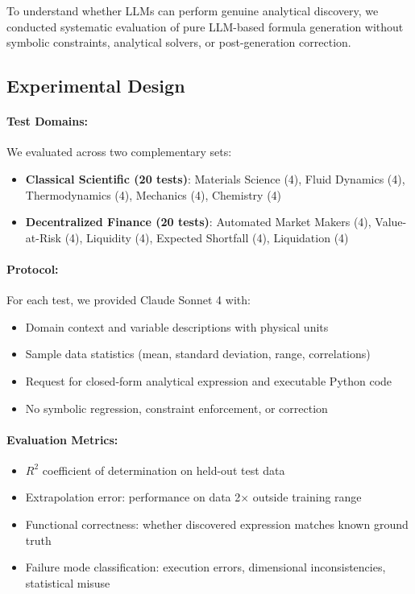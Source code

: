 \documentclass[twoside,11pt]{article}
\begin{document}
To understand whether LLMs can perform genuine analytical discovery, we conducted systematic evaluation of pure LLM-based formula generation without symbolic constraints, analytical solvers, or post-generation correction.

\subsection{Experimental Design}

\paragraph{Test Domains:} We evaluated across two complementary sets:

\begin{itemize}
\item \textbf{Classical Scientific (20 tests)}: Materials Science (4), Fluid Dynamics (4), Thermodynamics (4), Mechanics (4), Chemistry (4)
\item \textbf{Decentralized Finance (20 tests)}: Automated Market Makers (4), Value-at-Risk (4), Liquidity (4), Expected Shortfall (4), Liquidation (4)
\end{itemize}

\paragraph{Protocol:} For each test, we provided Claude Sonnet 4 with:
\begin{itemize}
\item Domain context and variable descriptions with physical units
\item Sample data statistics (mean, standard deviation, range, correlations)
\item Request for closed-form analytical expression and executable Python code
\item No symbolic regression, constraint enforcement, or correction
\end{itemize}

\paragraph{Evaluation Metrics:}
\begin{itemize}
\item $R^2$ coefficient of determination on held-out test data
\item Extrapolation error: performance on data 2$\times$ outside training range
\item Functional correctness: whether discovered expression matches known ground truth
\item Failure mode classification: execution errors, dimensional inconsistencies, statistical misuse
\end{itemize}
\end{document}
